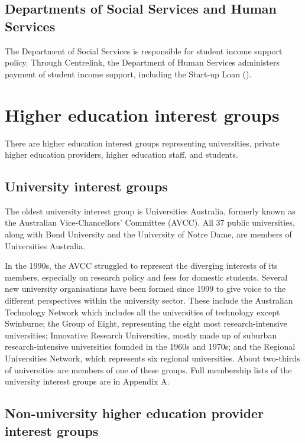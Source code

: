 \documentclass{grattan}
\begin{document}
%
\subsection{Departments of Social Services and Human Services}\label{subsec:departments-of-social-services-and-human-services}

The Department of Social Services is responsible for student income support policy. Through Centrelink, the Department of Human Services administers payment of student income support, including the Start-up Loan ().

%
\section{Higher education interest groups}\label{sec:higher-education-interest-groups}

There are higher education interest groups representing universities, private higher education providers, higher education staff, and students.

%
\subsection{University interest groups}\label{subsec:university-interest-groups}

The oldest university interest group is Universities Australia, formerly known as the Australian Vice-Chancellors' Committee (AVCC). All 37 public universities, along with Bond University and the University of Notre Dame, are members of Universities Australia.

In the 1990s, the AVCC struggled to represent the diverging interests of its members, especially on research policy and fees for domestic students. Several new university organisations have been formed since 1999 to give voice to the different perspectives within the university sector. These include the Australian Technology Network which includes all the universities of technology except Swinburne; the Group of Eight, representing the eight most research-intensive universities; Innovative Research Universities, mostly made up of suburban research-intensive universities founded in the 1960s and 1970s; and the Regional Universities Network, which represents six regional universities. About two-thirds of universities are members of one of these groups. Full membership lists of the university interest groups are in Appendix A.

%
\subsection{Non-university higher education provider interest groups}\label{subsec:non-university-higher-education-provider-interest-groups}
\end{document}
